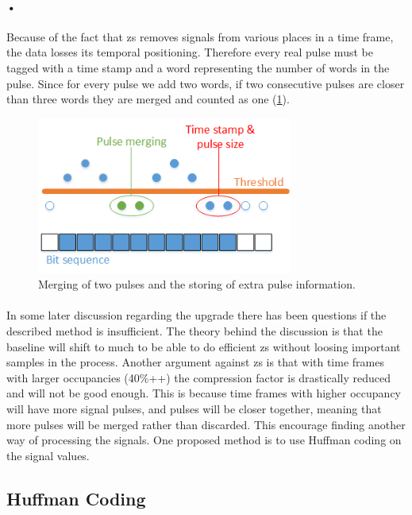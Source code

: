 \documentclass[a4paper, 12pt]{report}
\begin{document}
\paragraph{•}
Because of the fact that \gls{zs} removes signals from various places in a time frame, the data losses its temporal positioning.
Therefore every real pulse must be tagged with a time stamp and a word representing the number of words in the pulse.
Since for every pulse we add two words, if two consecutive pulses are closer than three words they are merged and counted as one (\ref{fig:merge}).

\begin{figure}[h!]
	\centering
		\includegraphics[width=0.75\textwidth]{images/merge.png}
		\caption{Merging of two pulses and the storing of extra pulse information.}
		\label{fig:merge}
\end{figure}

\paragraph{}
In some later discussion regarding the upgrade there has been questions if the described method is insufficient.
The theory behind the discussion is that the baseline will shift to much to be able to do efficient \gls{zs} without loosing important samples in the process.
Another argument against \gls{zs} is that with time frames with larger occupancies (40\%++) the compression factor is drastically reduced and will not be good enough.
This is because time frames with higher occupancy will have more signal pulses, and pulses will be closer together, meaning that more pulses will be merged rather than discarded. 
This encourage finding another way of processing the signals.
One proposed method is to use Huffman coding on the signal values.

\subsection{Huffman Coding} %
\end{document}
